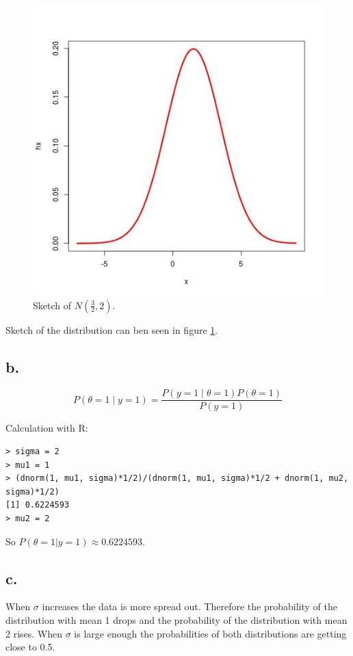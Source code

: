 \documentclass[11pt]{amsart}
\begin{document}
\begin{figure}[ht!]
  \includegraphics[width=\linewidth]{3-a}
  \caption{Sketch of $N(\frac{3}{2}, 2)$.}
  \label{fig:3-a}
\end{figure}

Sketch of the distribution can ben seen in figure \ref{fig:3-a}.

\subsection*{b.}

\[
    P(\theta = 1 \mid y = 1) = \frac{P(y=1 \mid \theta = 1) P(\theta=1)}{P(y=1)}
\]

Calculation with R:

\begin{verbatim}
> sigma = 2
> mu1 = 1
> (dnorm(1, mu1, sigma)*1/2)/(dnorm(1, mu1, sigma)*1/2 + dnorm(1, mu2, sigma)*1/2)
[1] 0.6224593
> mu2 = 2
\end{verbatim}

So $P(\theta = 1|y = 1) \approx 0.6224593$.

\subsection*{c.}

When $\sigma$ increases the data is more spread out. Therefore the probability of the distribution with mean 1 drops and the probability of the distribution with mean 2 rises. When $\sigma$ is large enough the probabilities of both distributions are getting close to 0.5.
\end{document}
